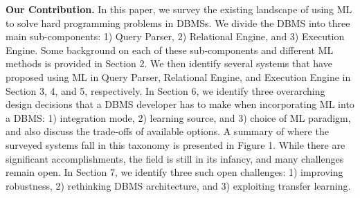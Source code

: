\vspace{2mm}
\noindent \textbf{Our Contribution.} In this paper, we survey the existing landscape of using ML to solve hard programming problems in DBMSs. 
We divide the DBMS into three main sub-components: 1) Query Parser, 2) Relational Engine, and 3) Execution Engine. Some background on each of these sub-components and different ML methods is provided in Section 2.
We then identify several systems that have proposed using ML in Query Parser, Relational Engine, and Execution Engine in Section 3, 4, and 5, respectively.
In Section 6, we identify three overarching design decisions that a DBMS developer has to make when incorporating ML into a DBMS: 1) integration mode, 2) learning source, and 3) choice of ML paradigm, and also discuss the trade-offs of available options.
A summary of where the surveyed systems fall in this taxonomy is presented in Figure 1.
While there are significant accomplishments, the field is still in its infancy, and many challenges remain open.
In Section 7, we identify three such open challenges: 1) improving robustness, 2) rethinking DBMS architecture, and 3) exploiting transfer learning.